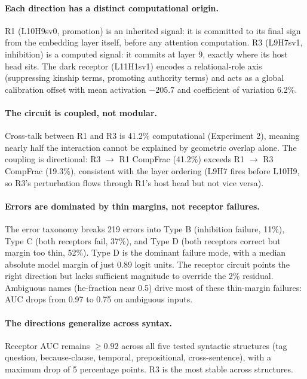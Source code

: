 \documentclass[11pt,a4paper]{article}
\begin{document}
\paragraph{Each direction has a distinct computational origin.} R1 (L10H9sv0, promotion) is an inherited signal: it is committed to its final sign from the embedding layer itself, before any attention computation. R3 (L9H7sv1, inhibition) is a computed signal: it commits at layer 9, exactly where its host head sits. The dark receptor (L11H1sv1) encodes a relational-role axis (suppressing kinship terms, promoting authority terms) and acts as a global calibration offset with mean activation $-205.7$ and coefficient of variation 6.2\%.

\paragraph{The circuit is coupled, not modular.} Cross-talk between R1 and R3 is 41.2\% computational (Experiment 2), meaning nearly half the interaction cannot be explained by geometric overlap alone. The coupling is directional: R3 $\to$ R1 CompFrac (41.2\%) exceeds R1 $\to$ R3 CompFrac (19.3\%), consistent with the layer ordering (L9H7 fires before L10H9, so R3's perturbation flows through R1's host head but not vice versa).

\paragraph{Errors are dominated by thin margins, not receptor failures.} The error taxonomy breaks 219 errors into Type B (inhibition failure, 11\%), Type C (both receptors fail, 37\%), and Type D (both receptors correct but margin too thin, 52\%). Type D is the dominant failure mode, with a median absolute model margin of just 0.89 logit units. The receptor circuit points the right direction but lacks sufficient magnitude to override the 2\% residual. Ambiguous names (he-fraction near 0.5) drive most of these thin-margin failures: AUC drops from 0.97 to 0.75 on ambiguous inputs.

\paragraph{The directions generalize across syntax.} Receptor AUC remains $\geq 0.92$ across all five tested syntactic structures (tag question, because-clause, temporal, prepositional, cross-sentence), with a maximum drop of 5 percentage points. R3 is the most stable across structures.
\end{document}
